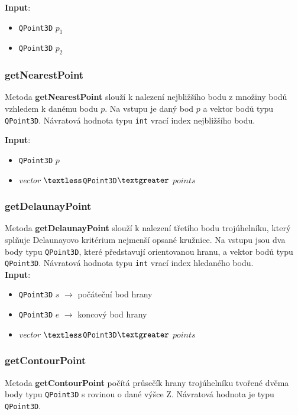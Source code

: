 \documentclass[a4paper, 12pt]{article}
\begin{document}
\textbf{Input}:
\begin{itemize}
\item \texttt{QPoint3D} $p_1$ 
\item \texttt{QPoint3D} $p_2$
\end{itemize}

\subsubsection*{getNearestPoint}
Metoda \textbf{getNearestPoint} slouží k nalezení nejbližšího bodu z množiny bodů vzhledem k danému bodu $p$. Na vstupu je daný bod $p$ a vektor bodů typu \texttt{QPoint3D}. Návratová hodnota typu \texttt{int} vrací index nejbližšího bodu.

\textbf{Input}:
\begin{itemize}
\item \texttt{QPoint3D} $p$ 
\item \textsl{vector} $\textless$\texttt{QPoint3D}$\textgreater$ $points$
\end{itemize}

\subsubsection*{getDelaunayPoint}
Metoda \textbf{getDelaunayPoint} slouží k nalezení třetího bodu trojúhelníku, který splňuje Delaunayovo kritérium nejmenší opsané kružnice. Na vstupu jsou dva body typu \texttt{QPoint3D}, které představují orientovanou hranu, a vektor bodů typu \texttt{QPoint3D}. Návratová hodnota typu \texttt{int} vrací index hledaného bodu.\\

\textbf{Input}:
\begin{itemize}
\item \texttt{QPoint3D} $s$ $\rightarrow$ počáteční bod hrany
\item \texttt{QPoint3D} $e$ $\rightarrow$ koncový bod hrany
\item \textsl{vector} $\textless$\texttt{QPoint3D}$\textgreater$ $points$
\end{itemize}

\subsubsection*{getContourPoint}
Metoda \textbf{getContourPoint} počítá průsečík hrany trojúhelníku tvořené dvěma body typu \texttt{QPoint3D} s rovinou o dané výšce Z. Návratová hodnota je typu \texttt{QPoint3D}.\\
\end{document}
